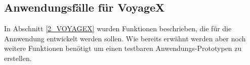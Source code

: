\subsection{Anwendungsfälle für VoyageX}\label{4_UC}
In Abschnitt \ref{2_VOYAGEX} wurden Funktionen beschrieben, die für die Annwendung entwickelt werden sollen.
Wie bereits erwähnt werden aber noch weitere Funktionen benötigt um einen testbaren Anwendungs-Prototypen zu erstellen. 


